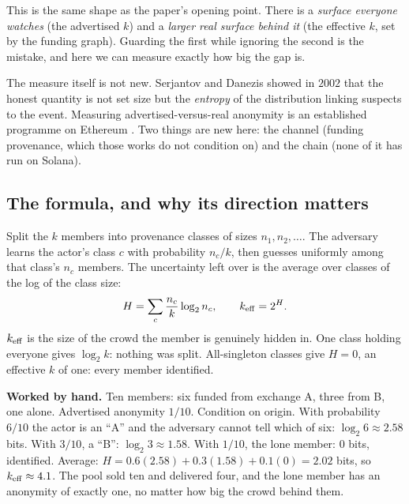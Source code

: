 \documentclass[11pt]{article}
\begin{document}
\begin{intuition}
This is the same shape as the paper's opening point. There is a \emph{surface everyone
watches} (the advertised $k$) and a \emph{larger real surface behind it} (the effective
$k$, set by the funding graph). Guarding the first while ignoring the second is the
mistake, and here we can measure exactly how big the gap is.
\end{intuition}

The measure itself is not new. Serjantov and Danezis \cite{serjantov2002} showed in
$2002$ that the honest quantity is not set size but the \emph{entropy} of the
distribution linking suspects to the event. Measuring advertised-versus-real anonymity
is an established programme on Ethereum \cite{tutela,beres,crosschain,du}. Two things are
new here: the channel (funding provenance, which those works do not condition on) and
the chain (none of it has run on Solana).

\subsection{The formula, and why its direction matters}

Split the $k$ members into provenance classes of sizes $n_1, n_2, \dots$. The adversary
learns the actor's class $c$ with probability $n_c/k$, then guesses uniformly among that
class's $n_c$ members. The uncertainty left over is the average over classes of the log
of the class size:
\begin{equation}
H = \sum_c \frac{n_c}{k}\log_2 n_c, \qquad k_{\mathrm{eff}} = 2^{H}.
\label{eq:effk}
\end{equation}
$k_{\mathrm{eff}}$ is the size of the crowd the member is genuinely hidden in. One class holding
everyone gives $\log_2 k$: nothing was split. All-singleton classes give $H = 0$, an
effective $k$ of one: every member identified.

\begin{intuition}
\textbf{Worked by hand.} Ten members: six funded from exchange A, three from B, one
alone. Advertised anonymity $1/10$. Condition on origin. With probability $6/10$ the
actor is an ``A'' and the adversary cannot tell which of six: $\log_2 6 \approx 2.58$
bits. With $3/10$, a ``B'': $\log_2 3 \approx 1.58$. With $1/10$, the lone member: $0$
bits, identified. Average: $H = 0.6(2.58)+0.3(1.58)+0.1(0) = 2.02$ bits, so $k_{\mathrm{eff}}
\approx 4.1$. The pool sold ten and delivered four, and the lone member has an anonymity
of exactly one, no matter how big the crowd behind them.
\end{intuition}
\end{document}
